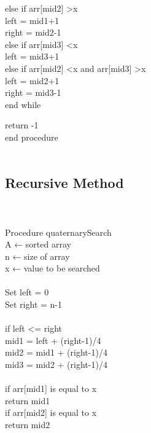 \documentclass[conference]{IEEEtran}
\begin{document}
  else if arr[mid2] \textgreater x\\
  \indent
   \hspace{1cm}left = mid1+1\\
   \indent
  \hspace{1cm}right = mid2-1\\
  
  else if arr[mid3] \textless x\\
  \indent
   \hspace{1cm}left = mid3+1\\
   
  else if arr[mid2] \textless x and arr[mid3] \textgreater x\\
  \indent
   \hspace{1cm}left = mid2+1\\
   \indent
   \hspace{1cm}right = mid3-1\\
   end while
   
\noindent return -1\\
end procedure\\\\

\subsection{Recursive Method}\\\\
Procedure quaternarySearch\\
   A ← sorted array\\
   n ← size of array\\
   x ← value to be searched\\\\
Set left = 0\\
Set right = n-1\\\\
if left \textless=  right\\

mid1 = left + (right-1)/4\\
\indent
mid2 = mid1 + (right-1)/4\\
 \indent
mid3 = mid2 + (right-1)/4\\\\
 \indent
 if arr[mid1] is equal to x\\
 \indent
  \hspace{1cm}return mid1\\
  
if arr[mid2] is equal to x\\
 \indent
  \hspace{1cm}return mid2\\
  
\end{document}
